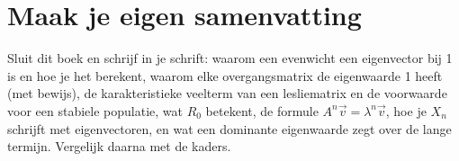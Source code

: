 \begin{oefeningen}






\end{oefeningen}


\ifzelfstudie
\section*{Maak je eigen samenvatting}
Sluit dit boek en schrijf in je schrift: waarom een evenwicht een eigenvector bij 1 is en hoe je het berekent, waarom elke overgangsmatrix de eigenwaarde 1 heeft (met bewijs), de karakteristieke veelterm van een lesliematrix en de voorwaarde voor een stabiele populatie, wat $R_0$ betekent, de formule $A^n\vec v = \lambda^n\vec v$, hoe je $X_n$ schrijft met eigenvectoren, en wat een dominante eigenwaarde zegt over de lange termijn. Vergelijk daarna met de kaders.
\fi
